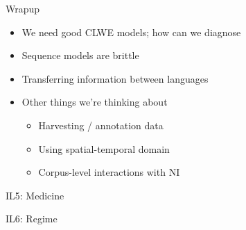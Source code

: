 \documentclass[compress]{beamer}
\newcommand{\fsi}[2]{
\begin{frame}[plain]
\vspace*{-1pt}
\makebox[\linewidth]{\texttt{[image: \#1]}}
\begin{center}
#2
\end{center}
\end{frame}
}
\begin{document}
\begin{frame}{Wrapup}

  \begin{itemize}
    \item We need good CLWE models; how can we diagnose
    \item Sequence models are brittle
    \item Transferring information between languages
      \pause
      \item Other things we're thinking about
    \begin{itemize}
      \item Harvesting / annotation data
      \item Using spatial-temporal domain
      \item Corpus-level interactions with NI
    \end{itemize}
  \end{itemize}

\end{frame}

\fsi{clwe/il5_med}{IL5: Medicine}

\fsi{clwe/il6_regime}{IL6: Regime}
\end{document}
